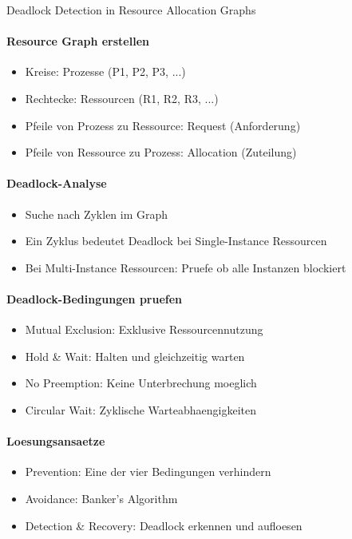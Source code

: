 \begin{KR}{Deadlock Detection in Resource Allocation Graphs}
    \paragraph{Resource Graph erstellen}
    \begin{itemize}
        \item Kreise: Prozesse (P1, P2, P3, ...)
        \item Rechtecke: Ressourcen (R1, R2, R3, ...)
        \item Pfeile von Prozess zu Ressource: Request (Anforderung)
        \item Pfeile von Ressource zu Prozess: Allocation (Zuteilung)
    \end{itemize}
    
    \paragraph{Deadlock-Analyse}
    \begin{itemize}
        \item Suche nach Zyklen im Graph
        \item Ein Zyklus bedeutet Deadlock bei Single-Instance Ressourcen
        \item Bei Multi-Instance Ressourcen: Pruefe ob alle Instanzen blockiert
    \end{itemize}
    
    \paragraph{Deadlock-Bedingungen pruefen}
    \begin{itemize}
        \item Mutual Exclusion: Exklusive Ressourcennutzung
        \item Hold \& Wait: Halten und gleichzeitig warten
        \item No Preemption: Keine Unterbrechung moeglich
        \item Circular Wait: Zyklische Warteabhaengigkeiten
    \end{itemize}
    
    \paragraph{Loesungsansaetze}
    \begin{itemize}
        \item Prevention: Eine der vier Bedingungen verhindern
        \item Avoidance: Banker's Algorithm
        \item Detection \& Recovery: Deadlock erkennen und aufloesen
    \end{itemize}
\end{KR}

